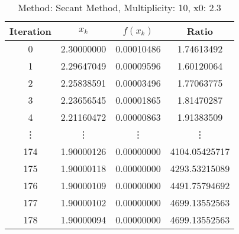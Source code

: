 \begin{table}
\centering
\caption{Method: Secant Method, Multiplicity: 10, x0: 2.3}
\label{tab:table_Secant_Method_10_2_3}
\begin{tabular}{c c c c}
\toprule
Iteration &      $x_k$ &   $f(x_k)$ &         Ratio \\
\midrule
        0 & 2.30000000 & 0.00010486 &    1.74613492 \\
        1 & 2.29647049 & 0.00009596 &    1.60120064 \\
        2 & 2.25838591 & 0.00003496 &    1.77063775 \\
        3 & 2.23656545 & 0.00001865 &    1.81470287 \\
        4 & 2.21160472 & 0.00000863 &    1.91383509 \\
   \vdots &     \vdots &     \vdots &        \vdots \\
      174 & 1.90000126 & 0.00000000 & 4104.05425717 \\
      175 & 1.90000118 & 0.00000000 & 4293.53215089 \\
      176 & 1.90000109 & 0.00000000 & 4491.75794692 \\
      177 & 1.90000102 & 0.00000000 & 4699.13552563 \\
      178 & 1.90000094 & 0.00000000 & 4699.13552563 \\
\bottomrule
\end{tabular}
\end{table}
